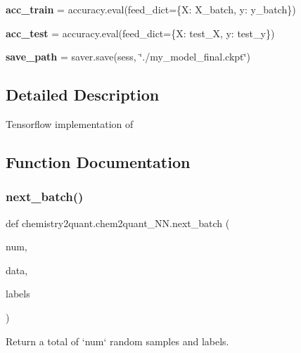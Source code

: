 \begin{DoxyCompactItemize}
{\bfseries acc\+\_\+train} = accuracy.\+eval(feed\+\_\+dict=\{X\+: X\+\_\+batch, y\+: y\+\_\+batch\})
\item 
\mbox{\label{namespacechemistry2quant_1_1chem2quant__NN_a67145a74ce2fac9a16f2dc7efe4587ca}} 
{\bfseries acc\+\_\+test} = accuracy.\+eval(feed\+\_\+dict=\{X\+: test\+\_\+X, y\+: test\+\_\+y\})
\item 
\mbox{\label{namespacechemistry2quant_1_1chem2quant__NN_a376410e5c5692144e1a528a4f8b9d85a}} 
{\bfseries save\+\_\+path} = saver.\+save(sess, \char`\"{}./my\+\_\+model\+\_\+final.\+ckpt\char`\"{})
\end{DoxyCompactItemize}


\subsection{Detailed Description}
\begin{DoxyVerb}Tensorflow implementation of 
\end{DoxyVerb}
 

\subsection{Function Documentation}
\mbox{\label{namespacechemistry2quant_1_1chem2quant__NN_afb055d34a228ae670b94588087aa897e}} 
\subsubsection{\texorpdfstring{next\+\_\+batch()}{next\_batch()}}
{\footnotesize\ttfamily def chemistry2quant.\+chem2quant\+\_\+\+N\+N.\+next\+\_\+batch (\begin{DoxyParamCaption}\item[{}]{num,  }\item[{}]{data,  }\item[{}]{labels }\end{DoxyParamCaption})}

\begin{DoxyVerb}Return a total of `num` random samples and labels. 
\end{DoxyVerb}
 